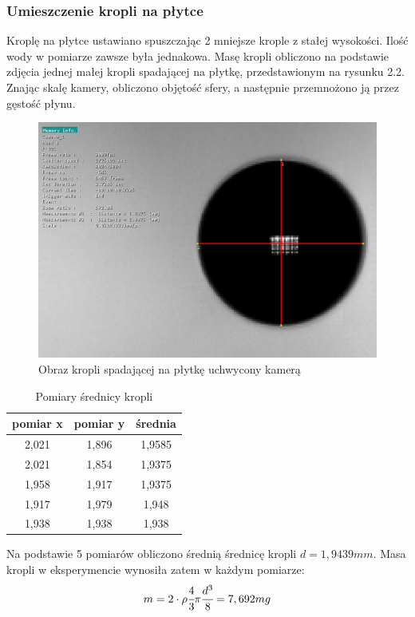 \subsubsection{Umieszczenie kropli na płytce}
Kroplę na płytce ustawiano spuszczając 2 mniejsze krople z stałej wysokości. Ilość wody w pomiarze zawsze była jednakowa. Masę kropli obliczono na podstawie zdjęcia jednej małej kropli spadającej na płytkę, przedstawionym na rysunku 2.2. Znając skalę kamery, obliczono objętość sfery, a następnie przemnożono ją przez gęstość płynu.

\begin{figure}[!h]
    \label{fig:poślizg}
    \centering \includegraphics[width=0.8\linewidth]{img/drop.png}
    \caption{Obraz kropli spadającej na płytkę uchwycony kamerą}
\end{figure}

\begin{table}[!h] \centering \label{tab:tabela1}
\begin{tabular} {| c | c | c  |} \hline 
pomiar x & pomiar y	& średnia \\
\hline
2,021 & 1,896 & 1,9585\\
2,021 &	1,854 & 1,9375\\
1,958 &	1,917 &	1,9375\\
1,917 &	1,979 &	1,948\\
1,938 &	1,938 &	1,938\\
\hline
\end{tabular}
\caption{Pomiary średnicy kropli}
\end{table}
Na podstawie 5 pomiarów obliczono średnią średnicę kropli $d = 1,9439 mm$. Masa kropli w eksperymencie wynosiła zatem w każdym pomiarze:
\begin{align*}
    m = 2 \cdot \rho \cfrac{4}{3}\pi\cfrac{d^3}{8} = 7,692 mg
\end{align*}
